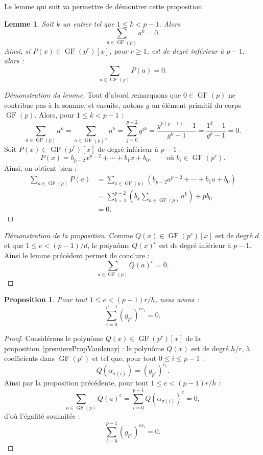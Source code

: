 \documentclass[a4paper, titlepage, 11pt]{article}
\newtheorem{lemm}[theo]{Lemme}
\newtheorem{prop}[theo]{Proposition}
\theoremstyle{definition}
\theoremstyle{remark}
\def\gf{\operatorname{GF}}
\begin{document}
Le lemme qui suit va permettre de démontrer cette proposition.

\begin{lemm}
Soit $k$ un entier tel que $1 \leqslant k < p-1$. Alors
$$\sum_{a\in\gf(p)} a^k = 0.$$
Ainsi, si $P(x) \in \gf(p^r)[x]$, pour $r \geqslant 1$, est de degré inférieur à $p-1$, alors : $$\sum_{a\in\gf(p)} P(a) = 0.$$
\end{lemm}

\begin{proof}[Démonstration du lemme]
Tout d'abord remarquons que $0 \in \gf(p)$ ne contribue pas à la somme, et ensuite, notons $g$ un élément primitif du corps $\gf(p)$. Alors, pour $1 \leqslant k < p-1$ :
$$\sum_{a\in\gf(p)} a^k = \sum_{a\in\gf(p)^\times} a^k = \sum_{j=0}^{p-2} g^{jk} = \frac{g^{k(p-1)} - 1}{g^{k} - 1} = \frac{1^{k} - 1}{g^{k} - 1} = 0.$$
Soit $P(x) \in \gf(p^r)[x]$ de degré inférieur à $p-1$ :
$$P(x) = b_{p-2}x^{p-2} + \cdots + b_1x + b_0, \qquad \text{où }b_i \in \gf(p^r).$$
Ainsi, on obtient bien :
\begin{align*}
\sum_{a\in\gf(p)} P(a) &= \sum_{a\in\gf(p)} \left({b_{p-2}a^{p-2} + \cdots + b_1a + b_0}\right) \\
&= \sum_{k=1}^{p-2} \left({ b_k\sum_{a\in\gf(p)} a^k}\right) + pb_0 \\
&= 0.
\end{align*}
\end{proof}

\begin{proof}[Démonstration de la proposition]
Comme $Q(x) \in \gf(p^r)[x]$ est de degré $d$ et que $1\leqslant e < (p-1)/d$, le polynôme $Q(x)^e$ est de degré inférieur à $p-1$. Ainsi le lemme précédent permet de conclure :
$$\sum_{a\in\gf(p)} Q(a)^e = 0.$$
\end{proof}

\begin{prop}
Pour tout $1 \leqslant e < (p-1)r/h$, nous avons :
$$\sum_{i=0}^{p-1} (g_{p^r})^{ec_i} = 0.$$
\end{prop}

\begin{proof}
Considérons le polynôme $Q(x)\in\gf(p^r)[x]$ de la proposition~\ref{premierePropVaudenay} : le polynôme $Q(x)$ est de degré $h/r$, à coefficients dans $\gf(p^r)$ et tel que, pour tout $0 \leqslant i \leqslant p-1$ :
$$Q\left(\alpha_{\sigma(i)}\right) = (g_{p^r})^{c_i}.$$
Ainsi par la proposition précédente, pour tout $1 \leqslant e < (p-1)r/h$ :
$$\sum_{a\in\gf(p)} Q(a)^e = \sum_{i=0}^{p-1} Q\left(\alpha_{\sigma(i)}\right)^e = 0,$$
d'où l'égalité souhaitée :
$$\sum_{i=0}^{p-1} (g_{p^r})^{ec_i} = 0.$$
\end{proof}
\end{document}
